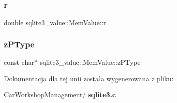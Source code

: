 \mbox{\label{unionsqlite3__value_1_1_mem_value_a1ee2234757006f9ee4e53f559ecf0deb}} 
\subsubsection{r}
{\footnotesize\ttfamily double sqlite3\+\_\+value\+::\+Mem\+Value\+::r}

\mbox{\label{unionsqlite3__value_1_1_mem_value_aed94bbb7318a22f97e8c9d2f8b6031b5}} 
\subsubsection{zPType}
{\footnotesize\ttfamily const char$\ast$ sqlite3\+\_\+value\+::\+Mem\+Value\+::z\+P\+Type}



Dokumentacja dla tej unii została wygenerowana z pliku\+:\begin{DoxyCompactItemize}
\item 
Car\+Workshop\+Management/\textbf{ sqlite3.\+c}\end{DoxyCompactItemize}
